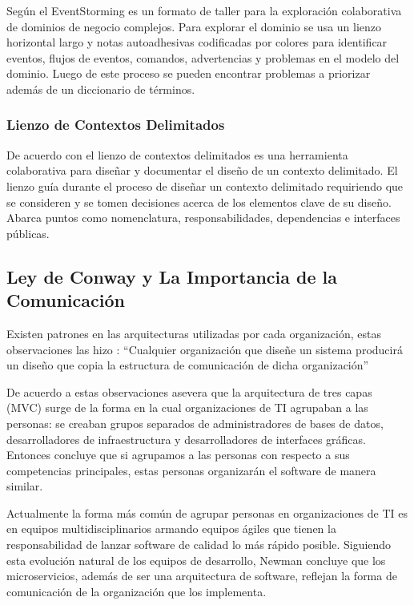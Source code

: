 Según \cite{brandolini2013introducing} el EventStorming es un formato de taller para la exploración
colaborativa de dominios de negocio complejos.
Para explorar el dominio se usa un lienzo horizontal largo y notas autoadhesivas codificadas por colores
para identificar eventos, flujos de eventos, comandos, advertencias y problemas en el modelo del dominio.
Luego de este proceso se pueden encontrar problemas a priorizar además de un diccionario de términos.

\subsubsection{Lienzo de Contextos Delimitados}

De acuerdo con \cite{richardson2018microservices} el lienzo de contextos delimitados es una herramienta
colaborativa para diseñar y documentar el diseño de un contexto delimitado.
El lienzo guía durante el proceso de diseñar un contexto delimitado requiriendo que se consideren
y se tomen decisiones acerca de los elementos clave de su diseño.
Abarca puntos como nomenclatura, responsabilidades, dependencias e interfaces públicas.


\subsection{Ley de Conway y La Importancia de la Comunicación}

Existen patrones en las arquitecturas utilizadas por cada organización, estas observaciones
las hizo \cite{conway1968committees}: ``Cualquier organización que diseñe un sistema producirá
un diseño que copia la estructura de comunicación de dicha organización''


De acuerdo a estas observaciones \cite{newman2019monolith} asevera que la arquitectura de tres capas
(MVC) surge de la forma en la cual organizaciones de TI agrupaban a las personas: se creaban grupos
separados de administradores de bases de datos, desarrolladores de infraestructura y desarrolladores
de interfaces gráficas. Entonces concluye que si agrupamos a las personas con respecto a sus competencias
principales, estas personas organizarán el software de manera similar.

Actualmente la forma más común de agrupar personas en organizaciones de TI es en equipos multidisciplinarios
armando equipos ágiles que tienen la responsabilidad de lanzar software de calidad lo más rápido posible.
Siguiendo esta evolución natural de los equipos de desarrollo, Newman concluye que los microservicios,
además de ser una arquitectura de software, reflejan la forma de comunicación de la organización
que los implementa.

